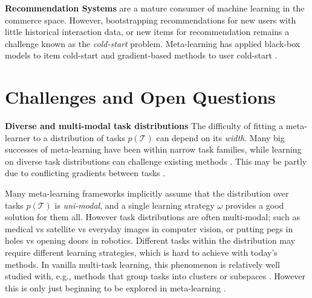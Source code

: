 \documentclass[10pt,journal,compsoc]{IEEEtran}
\newcommand{\keypoint}[1]{\vspace{0.1cm}\noindent\textbf{#1}\quad}
\begin{document}
\keypoint{Recommendation Systems}  are a mature consumer of machine learning in the commerce space. However, bootstrapping recommendations for new users with little historical interaction data, or new items for recommendation remains a challenge known as the \emph{cold-start} problem. Meta-learning has applied black-box models to item cold-start \cite{vartak2017coldItem} and gradient-based methods to user cold-start \cite{bharadhwaj2019coldUser}.


\section{Challenges and Open Questions}\label{sec:challenges}

\keypoint{Diverse and multi-modal task distributions} 
{The difficulty of fitting a meta-learner to a distribution of tasks $p(\mathcal{T})$ can depend on its \emph{width}. Many big successes of meta-learning have been within narrow task families, while learning on diverse task distributions can challenge existing methods \cite{yu2019meta,triantafillou2019metadataset,rebuff2017mdl}. This may be partly due to conflicting gradients between tasks \cite{yu2020gradientsurgery}.}

{Many meta-learning frameworks \cite{finn2017maml} implicitly assume that the distribution over tasks $p(\mathcal{T})$ is \emph{uni-modal}, and a single learning strategy $\omega$ provides a good solution for them all. However task distributions are often multi-modal; such as medical vs satellite vs everyday images in computer vision, or putting pegs in holes vs opening doors \cite{yu2019meta} in robotics. Different tasks within the distribution may require different learning strategies, which is hard to achieve with today's methods. In vanilla multi-task learning, this phenomenon is relatively well studied with, e.g., methods that group tasks into clusters \cite{kang2011whosharemtl} or subspaces \cite{yang2015mdmtl}. However this is only just beginning to be explored in meta-learning \cite{allen2019infprototypes}.}
\end{document}
